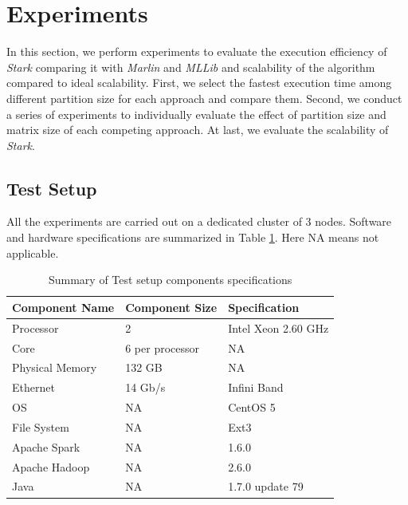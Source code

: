 %

\section{Experiments}
\label{sec:Experimental-Evaluation}
In this section, we perform experiments to evaluate the execution efficiency of \textit{Stark} comparing it with \textit{Marlin} and \textit{MLLib} and scalability of the algorithm compared to ideal scalability. First, we select the fastest execution time among different partition size for each approach and compare them. Second, we conduct a series of experiments to individually evaluate the effect of partition size and matrix size of each competing approach. At last, we evaluate the scalability of \textit{Stark}.

\subsection{Test Setup}
All the experiments are carried out on a dedicated cluster of 3 nodes. Software and hardware specifications are summarized in Table \ref{tab:test-setup}. Here NA means not applicable.

\begin{table}[h!]
	\caption{Summary of Test setup components specifications}
	\label{tab:test-setup}
	\begin{minipage}{\columnwidth}
		\begin{center}
			\begin{tabular}{lll}
				\toprule
				Component Name & Component Size & Specification \\
				\toprule
				Processor & 2 & Intel Xeon 2.60 GHz \\
				Core & 6 per processor & NA \\
				Physical Memory & 132 GB & NA \\
				Ethernet & 14 Gb/s & Infini Band \\
				OS & NA & CentOS 5 \\
				File System & NA & Ext3 \\
				Apache Spark & NA & 1.6.0 \\
				Apache Hadoop & NA & 2.6.0 \\
				Java & NA & 1.7.0 update 79 \\
				\bottomrule
			\end{tabular}
		\end{center}
	\end{minipage}
\end{table}


